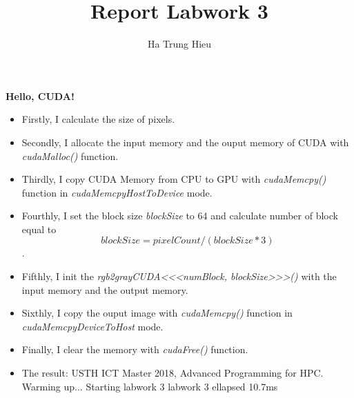 \documentclass{article}
\title{Report Labwork 3}
\author{Ha Trung Hieu}
\begin{document}
\maketitle

\textbf{Hello, CUDA!}

\begin{itemize}
	\item Firstly, I calculate the size of pixels.
		
	\item Secondly, I allocate the input memory and the ouput memory of CUDA with \textit{cudaMalloc()} function.
	\item Thirdly, I copy CUDA Memory from CPU to GPU with \textit{cudaMemcpy()} function in \textit{cudaMemcpyHostToDevice} mode.
	\item Fourthly, I set the block size \textit{blockSize} to 64 and calculate number of block equal to \[blockSize = pixelCount / (blockSize * 3)\].
	\item Fifthly, I init the \textit{rgb2grayCUDA<<<numBlock, blockSize>>>()} with the input memory and the output memory.
	\item Sixthly, I copy the ouput image with \textit{cudaMemcpy()} function in \textit{cudaMemcpyDeviceToHost} mode.
	\item Finally, I clear the memory with \textit{cudaFree()} function.
	\item The result:\newline
	USTH ICT Master 2018, Advanced Programming for HPC.\newline
    Warming up...\newline
    Starting labwork 3\newline
    labwork 3 ellapsed 10.7ms\newline
\end{itemize}
\end{document}
